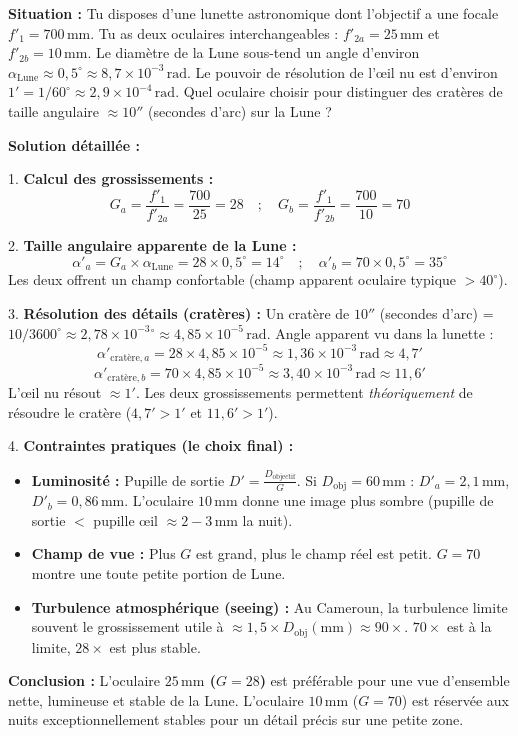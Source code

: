 \documentclass[11pt]{article}
\begin{document}
\begin{exemplebox}
\textbf{Situation :} Tu disposes d'une lunette astronomique dont l'objectif a une focale $f'_1 = 700\,\text{mm}$. Tu as deux oculaires interchangeables : $f'_{2a} = 25\,\text{mm}$ et $f'_{2b} = 10\,\text{mm}$. Le diamètre de la Lune sous-tend un angle d'environ $\alpha_{\text{Lune}} \approx 0,5^\circ \approx 8,7 \times 10^{-3}\,\text{rad}$. Le pouvoir de résolution de l'œil nu est d'environ $1' = 1/60^\circ \approx 2,9 \times 10^{-4}\,\text{rad}$. Quel oculaire choisir pour distinguer des cratères de taille angulaire $\approx 10''$ (secondes d'arc) sur la Lune ?

\textbf{Solution détaillée :}

1. \textbf{Calcul des grossissements :}
\[
G_a = \frac{f'_1}{f'_{2a}} = \frac{700}{25} = 28 \quad ; \quad G_b = \frac{f'_1}{f'_{2b}} = \frac{700}{10} = 70
\]

2. \textbf{Taille angulaire apparente de la Lune :}
\[
\alpha'_{a} = G_a \times \alpha_{\text{Lune}} = 28 \times 0,5^\circ = 14^\circ \quad ; \quad \alpha'_{b} = 70 \times 0,5^\circ = 35^\circ
\]
Les deux offrent un champ confortable (champ apparent oculaire typique $> 40^\circ$).

3. \textbf{Résolution des détails (cratères) :}
Un cratère de $10''$ (secondes d'arc) = $10/3600^\circ \approx 2,78 \times 10^{-3}{}^\circ \approx 4,85 \times 10^{-5}\,\text{rad}$.
Angle apparent vu dans la lunette :
\[
\alpha'_{\text{cratère}, a} = 28 \times 4,85 \times 10^{-5} \approx 1,36 \times 10^{-3}\,\text{rad} \approx 4,7'
\]
\[
\alpha'_{\text{cratère}, b} = 70 \times 4,85 \times 10^{-5} \approx 3,40 \times 10^{-3}\,\text{rad} \approx 11,6'
\]
L'œil nu résout $\approx 1'$. Les deux grossissements permettent \emph{théoriquement} de résoudre le cratère ($4,7' > 1'$ et $11,6' > 1'$).

4. \textbf{Contraintes pratiques (le choix final) :}
\begin{itemize}
    \item \textbf{Luminosité :} Pupille de sortie $D' = \frac{D_{\text{objectif}}}{G}$. Si $D_{\text{obj}} = 60\,\text{mm}$ : $D'_a = 2,1\,\text{mm}$, $D'_b = 0,86\,\text{mm}$. L'oculaire $10\,\text{mm}$ donne une image plus sombre (pupille de sortie $<$ pupille œil $\approx 2-3\,\text{mm}$ la nuit).
    \item \textbf{Champ de vue :} Plus $G$ est grand, plus le champ réel est petit. $G=70$ montre une toute petite portion de Lune.
    \item \textbf{Turbulence atmosphérique (seeing) :} Au Cameroun, la turbulence limite souvent le grossissement utile à $\approx 1,5 \times D_{\text{obj}}(\text{mm}) \approx 90\times$. $70\times$ est à la limite, $28\times$ est plus stable.
\end{itemize}
\textbf{Conclusion :} L'oculaire \textbf{$25\,\text{mm}$ ($G=28$)} est préférable pour une vue d'ensemble nette, lumineuse et stable de la Lune. L'oculaire $10\,\text{mm}$ ($G=70$) est réservée aux nuits exceptionnellement stables pour un détail précis sur une petite zone.
\end{exemplebox}
\end{document}

